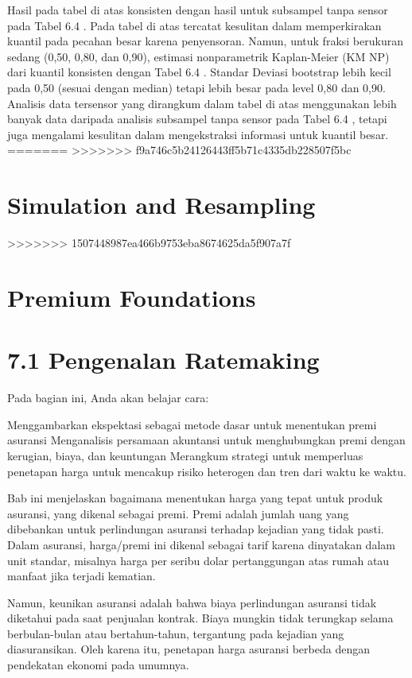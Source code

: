 \documentclass[
]{book}
\begin{document}
Hasil pada tabel di atas konsisten dengan hasil untuk subsampel tanpa sensor pada Tabel 6.4 . Pada tabel di atas tercatat kesulitan dalam memperkirakan kuantil pada pecahan besar karena penyensoran. Namun, untuk fraksi berukuran sedang (0,50, 0,80, dan 0,90), estimasi nonparametrik Kaplan-Meier (KM NP) dari kuantil konsisten dengan Tabel 6.4 . Standar Deviasi bootstrap lebih kecil pada 0,50 (sesuai dengan median) tetapi lebih besar pada level 0,80 dan 0,90. Analisis data tersensor yang dirangkum dalam tabel di atas menggunakan lebih banyak data daripada analisis subsampel tanpa sensor pada Tabel 6.4 , tetapi juga mengalami kesulitan dalam mengekstraksi informasi untuk kuantil besar.
=======
>>>>>>> f9a746c5b24126443ff5b71c4335db228507f5bc
\hypertarget{simulation-and-resampling}{%
\chapter{Simulation and Resampling}\label{simulation-and-resampling}}
>>>>>>> 1507448987ea466b9753eba8674625da5f907a7f

\hypertarget{premium-foundations}{%
\chapter{Premium Foundations}\label{premium-foundations}}

\hypertarget{pengenalan-ratemaking}{%
\chapter{7.1 Pengenalan Ratemaking}\label{pengenalan-ratemaking}}

Pada bagian ini, Anda akan belajar cara:

Menggambarkan ekspektasi sebagai metode dasar untuk menentukan premi asuransi
Menganalisis persamaan akuntansi untuk menghubungkan premi dengan kerugian, biaya, dan keuntungan
Merangkum strategi untuk memperluas penetapan harga untuk mencakup risiko heterogen dan tren dari waktu ke waktu.

Bab ini menjelaskan bagaimana menentukan harga yang tepat untuk produk asuransi, yang dikenal sebagai premi. Premi adalah jumlah uang yang dibebankan untuk perlindungan asuransi terhadap kejadian yang tidak pasti. Dalam asuransi, harga/premi ini dikenal sebagai tarif karena dinyatakan dalam unit standar, misalnya harga per seribu dolar pertanggungan atas rumah atau manfaat jika terjadi kematian.

Namun, keunikan asuransi adalah bahwa biaya perlindungan asuransi tidak diketahui pada saat penjualan kontrak. Biaya mungkin tidak terungkap selama berbulan-bulan atau bertahun-tahun, tergantung pada kejadian yang diasuransikan. Oleh karena itu, penetapan harga asuransi berbeda dengan pendekatan ekonomi pada umumnya.
\end{document}
